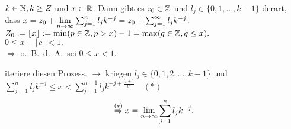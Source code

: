 \documentclass[../ana1.tex]{subfiles}
\begin{document}
\begin{satz}
	\(k\in\mathbb{N}, k\geq Z\) und \(x\in\mathbb{R} \). Dann gibt es \(z_0\in \mathbb{Z} \) und \(l_j \in \{0,1,\ldots,k-1\} \) derart, dass \(x = z_0 + \lim\limits_{n\rightarrow\infty} \sum_{j=1}^{n} l_j k^{-j} = z_0 + \sum_{j=1}^{\infty} l_j k^{-j} \).\\
	\(Z_0 := \lfloor x \rfloor := \min(p\in\mathbb{Z}, p>x) -1 = \max(q\in\mathbb{Z}, q\leq x). \) \\
	\( 0\leq x-\lfloor c\rfloor <1. \) \\
	\(\Rightarrow \) o.\ B.\ d.\ A.\ sei \(0\leq x<1\).
	\begin{center}
	\end{center}
	iteriere diesen Prozess.
	\(\rightarrow \) kriegen \(l_j \in \{0,1,2,\ldots,k-1 \} \) und \(\sum_{j=1}^{n} l_j k^{-j} \leq x < \sum_{j=1}^{n-1} l_j k^{-j + \frac{l_n + 1}{k^n}} \quad (*)\) \\
	\[ \overset{(*)}{\Rightarrow} x = \lim\limits_{n\rightarrow\infty} \sum_{j=1}^{n} l_j k^{-j}. \]
\end{satz}
\end{document}
